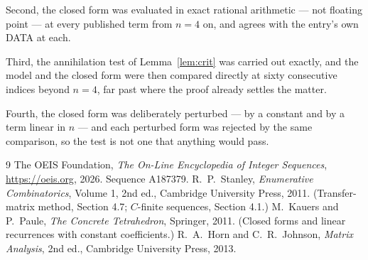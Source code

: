 \documentclass[11pt,a4paper]{article}
\theoremstyle{plain}
\theoremstyle{definition}
\begin{document}
Second, the closed form was evaluated in exact rational arithmetic --- not floating point ---
at every published term from $n=4$ on, and agrees with the entry's own DATA at each.

Third, the annihilation test of Lemma~\ref{lem:crit} was carried out exactly, and the model
and the closed form were then compared directly at sixty consecutive indices beyond
$n=4$, far past where the proof already settles the matter.

Fourth, the closed form was deliberately perturbed --- by a constant and by a term linear in
$n$ --- and each perturbed form was rejected by the same comparison, so the test is not one
that anything would pass.

\begin{thebibliography}{9}
 The OEIS Foundation, \emph{The On-Line Encyclopedia of Integer
Sequences}, \url{https://oeis.org}, 2026. Sequence A187379.
 R.~P.~Stanley, \emph{Enumerative Combinatorics}, Volume 1, 2nd ed.,
Cambridge University Press, 2011. (Transfer-matrix method, Section 4.7; $C$-finite sequences,
Section 4.1.)
 M.~Kauers and P.~Paule, \emph{The Concrete Tetrahedron}, Springer, 2011.
(Closed forms and linear recurrences with constant coefficients.)
 R.~A.~Horn and C.~R.~Johnson, \emph{Matrix Analysis}, 2nd ed., Cambridge
University Press, 2013.
\end{thebibliography}
\end{document}
